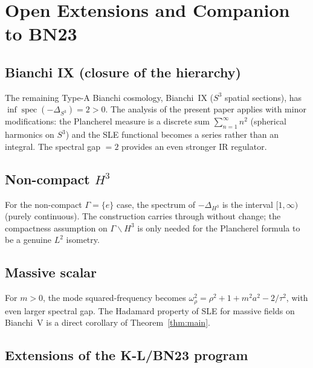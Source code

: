 \documentclass[12pt,letterpaper]{article}
\DeclareMathOperator{\spec}{spec}
\begin{document}
\section{Open Extensions and Companion to BN23}
\label{sec:extensions}

\subsection{Bianchi IX (closure of the hierarchy)}

The remaining Type-A Bianchi cosmology, Bianchi~IX ($S^3$ spatial sections),
has $\inf\spec(-\Delta_{S^3}) = 2 > 0$.
The analysis of the present paper applies with minor modifications:
the Plancherel measure is a discrete sum $\sum_{n=1}^\infty n^2$
(spherical harmonics on $S^3$) and the SLE functional becomes
a series rather than an integral.
The spectral gap $= 2$ provides an even stronger IR regulator.

\subsection{Non-compact $H^3$}

For the non-compact $\Gamma=\{e\}$ case, the spectrum of $-\Delta_{H^3}$
is the interval $[1,\infty)$ (purely continuous).
The construction carries through without change;
the compactness assumption on $\Gamma\backslash H^3$ is only needed for the
Plancherel formula to be a genuine $L^2$ isometry.

\subsection{Massive scalar}

For $m>0$, the mode squared-frequency becomes $\omega_\rho^2 = \rho^2 + 1 + m^2 a^2 - 2/\tau^2$,
with even larger spectral gap.
The Hadamard property of SLE for massive fields on Bianchi~V
is a direct corollary of Theorem~\ref{thm:main}.

\subsection{Extensions of the K-L/BN23 program}
\end{document}
